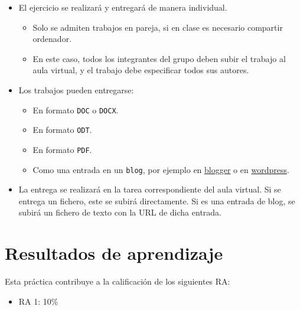 \documentclass[a4paper]{article}
\begin{document}
\begin{itemize}
\item El ejercicio se realizará y entregará de manera individual.

\begin{itemize}
\item Solo se admiten trabajos en pareja, si en clase es necesario compartir ordenador.
\item En este caso, todos los integrantes del grupo deben subir el trabajo al aula virtual, y el trabajo debe especificar todos sus autores.
\end{itemize}
\end{itemize}


\begin{itemize}
\item Los trabajos pueden entregarse:
\begin{itemize}
\item En formato \texttt{DOC} o \texttt{DOCX}.
\item En formato \texttt{ODT}.
\item En formato \texttt{PDF}.
\item Como una entrada en un \texttt{blog}, por ejemplo en \href{https://www.blogger.com/}{blogger} o en \href{https://wordpress.com/es/}{wordpress}.
\end{itemize}
\end{itemize}


\begin{itemize}
\item La entrega se realizará en la tarea correspondiente del aula virtual. Si se entrega un fichero, este se subirá directamente. Si es una entrada de blog, se subirá un fichero de texto con la URL de dicha entrada.
\end{itemize}

\section{Resultados de aprendizaje}
\label{sec:org0000012}
Esta práctica contribuye a la calificación de los siguientes RA:
\begin{itemize}
\item RA 1: 10\%
\end{itemize}
\end{document}

